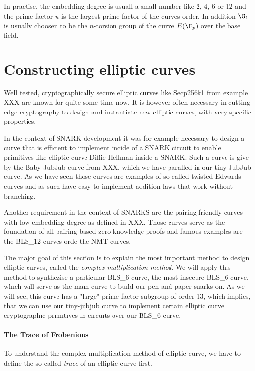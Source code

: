 In practise, the embedding degree is usuall a small number like $2$, $4$, $6$ or $12$ and the prime factor $n$ is the largest prime factor of the curves order. In addition $\G_1$ is usually choosen to be the $n$-torsion group of the curve $E(\F_p)$ over the base field.



\section{Constructing elliptic curves} Well tested, cryptographically secure elliptic curves like Secp256k1 from example XXX are known for quite some time now. It is however often necessary in cutting edge cryptography to design and instantiate new elliptic curves, with very specific properties. 

In the context of SNARK development it was for example necessary to design a curve that is efficient to implement incide of a SNARK circuit to enable primitives like elliptic curve Diffie Hellman inside a SNARK. Such a curve is give by the Baby-JubJub curve from XXX, which we have paralled in our tiny-JubJub curve. As we have seen those curves are examples of so called twisted Edwards curves and as such have easy to implement addition laws that work without branching. 

Another requirement in the context of SNARKS are the pairing friendly curves with low embedding degree as defined in XXX. Those curves serve as the foundation of all pairing based zero-knowledge proofs and famous examples are the BLS\_12 curves orde the NMT curves.

The major goal of this section is to explain the most important method to design elliptic curves, called the \textit{complex multiplication method}. We will apply this method to synthezise a particular BLS\_6 curve, the most insecure BLS\_6 curve, which will serve as the main curve to build our pen and paper snarks on. As we will see, this curve has a "large" prime factor subgroup of order $13$, which implies, that we can use our tiny-jubjub curve to implement certain elliptic curve cryptographic primitives in circuits over our BLS\_6 curve. 
 
\paragraph{The Trace of Frobenious} To understand the complex multiplication method of elliptic curve, we have to define the so called \textit{trace} of an elliptic curve first.

